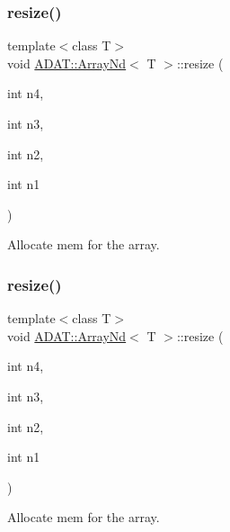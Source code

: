 \subsubsection{\texorpdfstring{resize()}{resize()}\hspace{0.1cm}{\footnotesize\ttfamily [13/15]}}
{\footnotesize\ttfamily template$<$class T$>$ \\
void \mbox{\hyperlink{classADAT_1_1ArrayNd}{A\+D\+A\+T\+::\+Array\+Nd}}$<$ T $>$\+::resize (\begin{DoxyParamCaption}\item[{int}]{n4,  }\item[{int}]{n3,  }\item[{int}]{n2,  }\item[{int}]{n1 }\end{DoxyParamCaption})\hspace{0.3cm}{\ttfamily [inline]}}



Allocate mem for the array. 

\mbox{\label{classADAT_1_1ArrayNd_a2a54d490a8a0a7aa9aeeaee6e6a84b90}} 
\subsubsection{\texorpdfstring{resize()}{resize()}\hspace{0.1cm}{\footnotesize\ttfamily [14/15]}}
{\footnotesize\ttfamily template$<$class T$>$ \\
void \mbox{\hyperlink{classADAT_1_1ArrayNd}{A\+D\+A\+T\+::\+Array\+Nd}}$<$ T $>$\+::resize (\begin{DoxyParamCaption}\item[{int}]{n4,  }\item[{int}]{n3,  }\item[{int}]{n2,  }\item[{int}]{n1 }\end{DoxyParamCaption})\hspace{0.3cm}{\ttfamily [inline]}}



Allocate mem for the array. 

\mbox{\label{classADAT_1_1ArrayNd_a2a54d490a8a0a7aa9aeeaee6e6a84b90}} 
